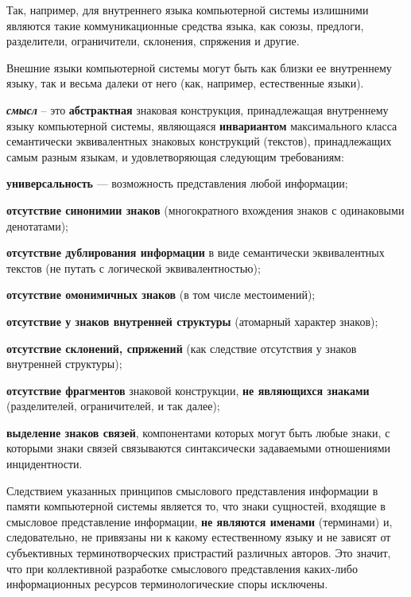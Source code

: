 Так, например, для внутреннего языка компьютерной системы излишними являются такие коммуникационные средства языка, как союзы, предлоги, разделители, ограничители, склонения, спряжения и другие.

Внешние языки компьютерной системы могут быть как близки ее внутреннему языку, так и весьма далеки от него (как, например, естественные языки).

\textbf{\textit{смысл}} – это \textbf{абстрактная} знаковая конструкция, принадлежащая внутреннему языку компьютерной системы, являющаяся \textbf{инвариантом} максимального класса семантически эквивалентных знаковых конструкций (текстов), принадлежащих самым разным языкам, и удовлетворяющая следующим требованиям:
\begin{textitemize}
	\item \textbf{универсальность} --- возможность представления любой информации;
	\item \textbf{отсутствие синонимии знаков} (многократного вхождения знаков с одинаковыми денотатами);
	\item \textbf{отсутствие дублирования информации} в виде семантически эквивалентных текстов (не путать с логической эквивалентностью);
	\item \textbf{отсутствие омонимичных знаков} (в том числе местоимений);
	\item \textbf{отсутствие у знаков внутренней структуры} (атомарный характер знаков);
	\item \textbf{отсутствие склонений, спряжений} (как следствие отсутствия у знаков внутренней структуры);
	\item \textbf{отсутствие фрагментов} знаковой конструкции, \textbf{не являющихся знаками} (разделителей, ограничителей, и так далее);
	\item \textbf{выделение знаков связей}, компонентами которых могут быть любые знаки, с которыми знаки связей связываются синтаксически задаваемыми отношениями инцидентности.
\end{textitemize}

Следствием указанных принципов смыслового представления информации в памяти компьютерной системы является то, что знаки сущностей, входящие в смысловое представление информации, \textbf{не являются именами} (терминами) и, следовательно, не привязаны ни к какому естественному языку и не зависят от субъективных терминотворческих пристрастий различных авторов. Это значит, что при коллективной разработке смыслового представления каких-либо информационных ресурсов терминологические споры исключены.

